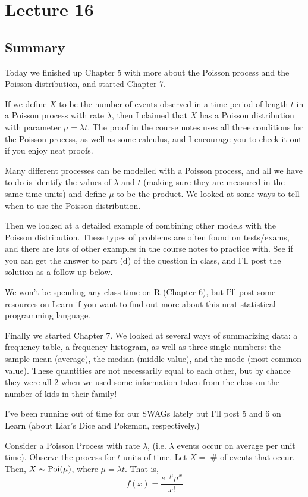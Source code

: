 \section{Lecture 16}
\subsection{Summary}
Today we finished up Chapter 5 with more about the Poisson process and the Poisson distribution, and started Chapter 7.

If we define $X$ to be the number of events observed in a time period of length $t$ in a Poisson process with rate $\lambda$, then I claimed that $X$ has a Poisson distribution with parameter $\mu = \lambda t$. The proof in the course notes uses all three conditions for the Poisson process, as well as some calculus, and I encourage you to check it out if you enjoy neat proofs.

Many different processes can be modelled with a Poisson process, and all we have to do is identify the values of $\lambda$ and $t$ (making sure they are measured in the same time units) and define $\mu$ to be the product. We looked at some ways to tell when to use the Poisson distribution.

Then we looked at a detailed example of combining other models with the Poisson distribution. These types of problems are often found on tests/exams, and there are lots of other examples in the course notes to practice with. See if you can get the answer to part (d) of the question in class, and I'll post the solution as a follow-up below.

We won't be spending any class time on R (Chapter 6), but I'll post some resources on Learn if you want to find out more about this neat statistical programming language.

Finally we started Chapter 7. We looked at several ways of summarizing data: a frequency table, a frequency histogram, as well as three single numbers: the sample mean (average), the median (middle value), and the mode (most common value). These quantities are not necessarily equal to each other, but by chance they were all 2 when we used some information taken from the class on the number of kids in their family!

I've been running out of time for our SWAGs lately but I'll post 5 and 6 on Learn (about Liar's Dice and Pokemon, respectively.)

Consider a Poisson Process with rate $ \lambda $, (i.e. $ \lambda $ events
occur on average per unit time). Observe the process for $ t $ units of time.
Let $ X= $ \# of events that occur. Then, $ X \thicksim \operatorname{Poi}(\mu) $, where
$ \mu=\lambda t $. That is,
\[ f(x)=\frac{e^{-\mu}\mu^x}{x!} \]

